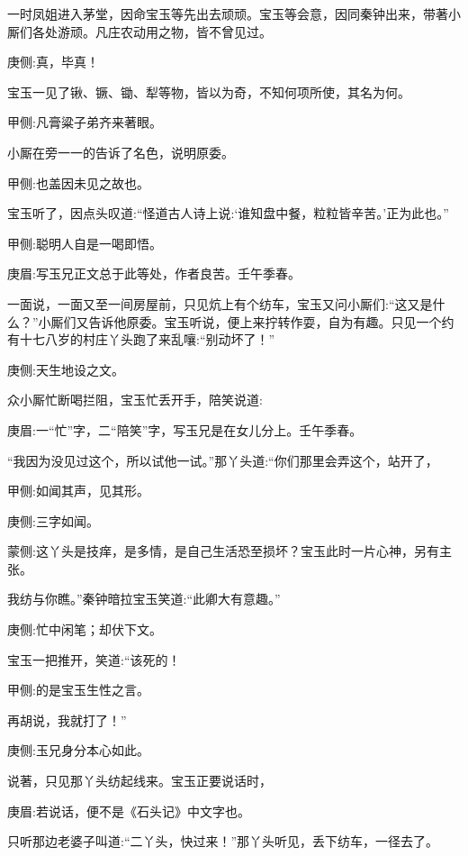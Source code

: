 \begin{parag}
    一时凤姐进入茅堂，因命宝玉等先出去顽顽。宝玉等会意，因同秦钟出来，带著小厮们各处游顽。凡庄农动用之物，皆不曾见过。\begin{note}庚侧:真，毕真！\end{note}宝玉一见了锹、镢、锄、犁等物，皆以为奇，不知何项所使，其名为何。\begin{note}甲侧:凡膏粱子弟齐来著眼。\end{note}小厮在旁一一的告诉了名色，说明原委。\begin{note}甲侧:也盖因未见之故也。\end{note}宝玉听了，因点头叹道:“怪道古人诗上说:‘谁知盘中餐，粒粒皆辛苦。’正为此也。”\begin{note}甲侧:聪明人自是一喝即悟。\end{note}\begin{note}庚眉:写玉兄正文总于此等处，作者良苦。壬午季春。\end{note}一面说，一面又至一间房屋前，只见炕上有个纺车，宝玉又问小厮们:“这又是什么？”小厮们又告诉他原委。宝玉听说，便上来拧转作耍，自为有趣。只见一个约有十七八岁的村庄丫头跑了来乱嚷:“别动坏了！”\begin{note}庚侧:天生地设之文。\end{note}众小厮忙断喝拦阻，宝玉忙丢开手，陪笑说道:\begin{note}庚眉:一“忙”字，二“陪笑”字，写玉兄是在女儿分上。壬午季春。\end{note}“我因为没见过这个，所以试他一试。”那丫头道:“你们那里会弄这个，站开了，\begin{note}甲侧:如闻其声，见其形。\end{note}\begin{note}庚侧:三字如闻。\end{note}\begin{note}蒙侧:这丫头是技痒，是多情，是自己生活恐至损坏？宝玉此时一片心神，另有主张。\end{note}我纺与你瞧。”秦钟暗拉宝玉笑道:“此卿大有意趣。”\begin{note}庚侧:忙中闲笔；却伏下文。\end{note}宝玉一把推开，笑道:“该死的！\begin{note}甲侧:的是宝玉生性之言。\end{note}再胡说，我就打了！”\begin{note}庚侧:玉兄身分本心如此。\end{note}说著，只见那丫头纺起线来。宝玉正要说话时，\begin{note}庚眉:若说话，便不是《石头记》中文字也。\end{note}只听那边老婆子叫道:“二丫头，快过来！”那丫头听见，丢下纺车，一径去了。
\end{parag}


